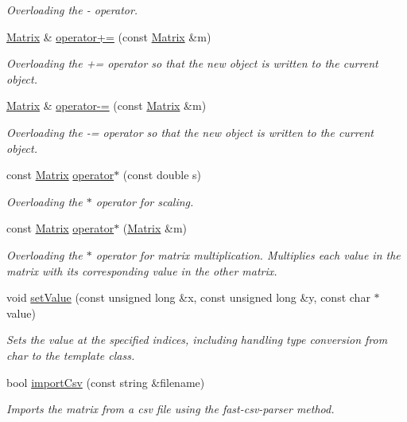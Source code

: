 \begin{DoxyCompactItemize}
\begin{DoxyCompactList}\small\item\em Overloading the -\/ operator. \end{DoxyCompactList}\item 
\hyperlink{class_matrix}{Matrix} \& \hyperlink{class_matrix_a480a72298ae1fc8443b0edfaa66d7c46}{operator+=} (const \hyperlink{class_matrix}{Matrix} \&m)
\begin{DoxyCompactList}\small\item\em Overloading the += operator so that the new object is written to the current object. \end{DoxyCompactList}\item 
\hyperlink{class_matrix}{Matrix} \& \hyperlink{class_matrix_a0e459fd035b2435ea016dc93c55ccac0}{operator-\/=} (const \hyperlink{class_matrix}{Matrix} \&m)
\begin{DoxyCompactList}\small\item\em Overloading the -\/= operator so that the new object is written to the current object. \end{DoxyCompactList}\item 
const \hyperlink{class_matrix}{Matrix} \hyperlink{class_matrix_ac4e94b307c56a15fb47a9255855f94a9}{operator$\ast$} (const double s)
\begin{DoxyCompactList}\small\item\em Overloading the $\ast$ operator for scaling. \end{DoxyCompactList}\item 
const \hyperlink{class_matrix}{Matrix} \hyperlink{class_matrix_ac396cdd2d98e1b4d99f7e17c1c26b1ec}{operator$\ast$} (\hyperlink{class_matrix}{Matrix} \&m)
\begin{DoxyCompactList}\small\item\em Overloading the $\ast$ operator for matrix multiplication. Multiplies each value in the matrix with its corresponding value in the other matrix. \end{DoxyCompactList}\item 
void \hyperlink{class_matrix_ae511e2f5874e7602fc968541efeefca1}{set\+Value} (const unsigned long \&x, const unsigned long \&y, const char $\ast$value)
\begin{DoxyCompactList}\small\item\em Sets the value at the specified indices, including handling type conversion from char to the template class. \end{DoxyCompactList}\item 
bool \hyperlink{class_matrix_a0a5d9135e9807b81ddc3cf05e777a902}{import\+Csv} (const string \&filename)
\begin{DoxyCompactList}\small\item\em Imports the matrix from a csv file using the fast-\/csv-\/parser method. \end{DoxyCompactList}\end{DoxyCompactItemize}
